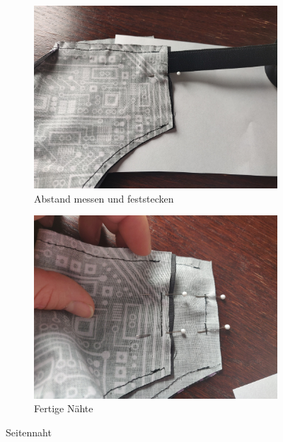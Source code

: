 \documentclass[12pt,parskip=full]{scrartcl}
\begin{document}
\begin{figure}[ht]
    \vspace{0.5cm}
    \centering
    \begin{subfigure}{0.48\textwidth}
        \centering
        \includegraphics[width = \linewidth]{Pictures/06_SideSeam/SideSeam1_resized.jpg}
        \caption{Abstand messen und feststecken}
        \label{SideSeam1}
    \end{subfigure}
    \begin{subfigure}{0.48\textwidth}
        \centering
        \includegraphics[width = \linewidth]{Pictures/06_SideSeam/SideSeam2_resized.jpg}
        \caption{Fertige Nähte}
        \label{SideSeam2}
    \end{subfigure}
    \caption{Seitennaht}
    \label{SideSeam}
\end{figure}
\end{document}
